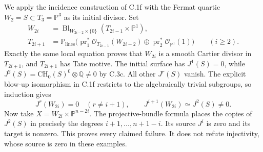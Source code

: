 We apply the incidence construction of C.1f with the Fermat quartic
$W_2=S\subset T_3=\mathbb P^3$ as its initial divisor. Set
\[
\begin{split}
 W_{2i}&=\operatorname{Bl}_{W_{2i-2}\times\{0\}}
                   (T_{2i-1}\times\mathbb P^1),\\
 T_{2i+1}&=\mathbb P_{\mathrm{lines}}
 \bigl(\operatorname{pr}_1^*\mathcal O_{T_{2i-1}}(W_{2i-2})
       \oplus\operatorname{pr}_2^*\mathcal O_{\mathbb P^1}(1)\bigr)
       \qquad(i\ge2).
\end{split}
\]
Exactly the same local equation proves that $W_{2i}$ is a smooth
Cartier divisor in $T_{2i+1}$, and $T_{2i+1}$ has Tate motive.
The initial surface has $J^1(S)=0$, while
$J^2(S)=\mathrm{CH}_0(S)^0\otimes\mathbb Q\ne0$ by C.3c.
All other $J^r(S)$ vanish. The explicit blow-up isomorphism in C.1f
restricts to the algebraically trivial subgroups, so induction gives
\[
 J^r(W_{2i})=0\quad(r\ne i+1),\qquad
 J^{i+1}(W_{2i})\simeq J^2(S)\ne0.
\]
Now take $X=W_{2i}\times\mathbb P^{n-2i}$. The projective-bundle
formula places the copies of $J^2(S)$ in precisely the degrees
$i+1,\ldots,n+1-i$. Its source $J^i$ is zero and its target is
nonzero. This proves every claimed failure. It does not refute
injectivity, whose source is zero in these examples.




































